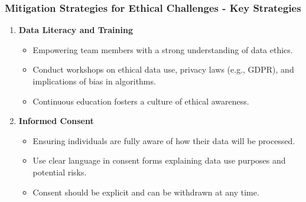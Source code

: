 \documentclass{beamer}
\begin{document}
\begin{frame}[fragile]
    \frametitle{Mitigation Strategies for Ethical Challenges - Key Strategies}
    \begin{enumerate}
        \item \textbf{Data Literacy and Training}
        \begin{itemize}
            \item Empowering team members with a strong understanding of data ethics.
            \item Conduct workshops on ethical data use, privacy laws (e.g., GDPR), and implications of bias in algorithms.
            \item Continuous education fosters a culture of ethical awareness.
        \end{itemize}
        
        \item \textbf{Informed Consent}
        \begin{itemize}
            \item Ensuring individuals are fully aware of how their data will be processed.
            \item Use clear language in consent forms explaining data use purposes and potential risks.
            \item Consent should be explicit and can be withdrawn at any time.
        \end{itemize}
    \end{enumerate}
\end{frame}
\end{document}
